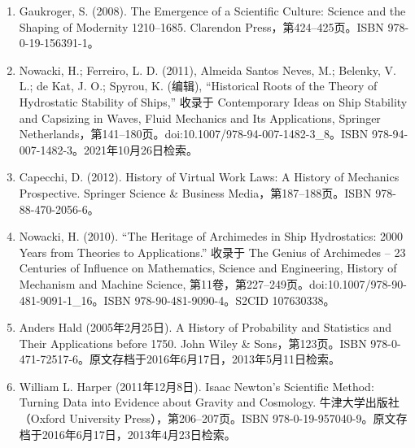 \begin{enumerate}
\item Gaukroger, S. (2008). The Emergence of a Scientific Culture: Science and the Shaping of Modernity 1210–1685. Clarendon Press，第424–425页。ISBN 978-0-19-156391-1。
\item Nowacki, H.; Ferreiro, L. D. (2011), Almeida Santos Neves, M.; Belenky, V. L.; de Kat, J. O.; Spyrou, K. (编辑), “Historical Roots of the Theory of Hydrostatic Stability of Ships,” 收录于 Contemporary Ideas on Ship Stability and Capsizing in Waves, Fluid Mechanics and Its Applications, Springer Netherlands，第141–180页。doi:10.1007/978-94-007-1482-3_8。ISBN 978-94-007-1482-3。2021年10月26日检索。
\item Capecchi, D. (2012). History of Virtual Work Laws: A History of Mechanics Prospective. Springer Science & Business Media，第187–188页。ISBN 978-88-470-2056-6。
\item Nowacki, H. (2010). “The Heritage of Archimedes in Ship Hydrostatics: 2000 Years from Theories to Applications.” 收录于 The Genius of Archimedes – 23 Centuries of Influence on Mathematics, Science and Engineering, History of Mechanism and Machine Science, 第11卷，第227–249页。doi:10.1007/978-90-481-9091-1_16。ISBN 978-90-481-9090-4。S2CID 107630338。
\item Anders Hald (2005年2月25日). A History of Probability and Statistics and Their Applications before 1750. John Wiley & Sons，第123页。ISBN 978-0-471-72517-6。原文存档于2016年6月17日，2013年5月11日检索。
\item William L. Harper (2011年12月8日). Isaac Newton's Scientific Method: Turning Data into Evidence about Gravity and Cosmology. 牛津大学出版社（Oxford University Press），第206–207页。ISBN 978-0-19-957040-9。原文存档于2016年6月17日，2013年4月23日检索。









\end{enumerate}


